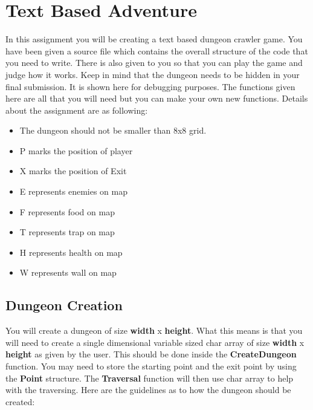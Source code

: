 \documentclass[a4paper,12pt]{article}
\begin{document}
\newpage
	
	\section{Text Based Adventure}
	In this assignment you will be creating a text based dungeon crawler game. You have been given a source file  which contains the overall structure of the code that you need to write. There is also  given to you so that you can play the game and judge how it works. Keep in mind that the dungeon needs to be hidden in your final submission. It is shown here for debugging purposes. The functions given here are all that you will need but you can make your own new functions. Details about the assignment are as following:
	
	\begin{itemize}
		\item The dungeon should not be smaller than 8x8 grid.
		\item P marks the position of player
		\item X marks the position of Exit
		\item E represents enemies on map
		\item F represents food on map
		\item T represents trap on map
		\item H represents health on map
		\item W represents wall on map
	\end{itemize}

	\subsection{Dungeon Creation}
	You will create a dungeon of size \textbf{width} x \textbf{height}. What this means is that you will need to create a single dimensional variable sized char array of size \textbf{width} x \textbf{height} as given by the user. This should be done inside the \textbf{CreateDungeon} function. You may need to store the starting point and the exit point by using the \textbf{Point} structure. The \textbf{Traversal} function will then use char array to help with the traversing. Here are the guidelines as to how the dungeon should be created:
	
\end{document}
